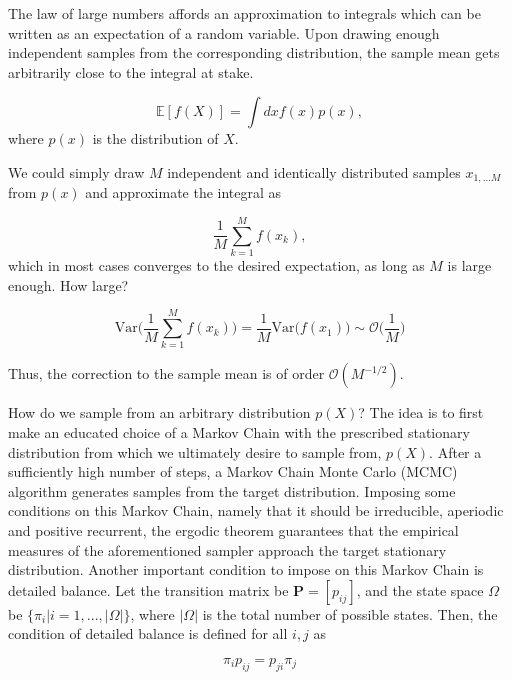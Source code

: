 The law of large numbers affords an approximation to integrals which can be written as an expectation of a random variable. Upon drawing enough independent samples from the corresponding distribution, the sample mean gets arbitrarily close to the integral at stake.

\begin{equation}\label{eq:int_mean}
\mathbb{E} [f(X)] = \int dx f(x) p(x),
\end{equation}
where $p(x)$ is the distribution of $X$. 

We could simply draw $M$ independent and identically distributed samples $x_{1,...M}$ from $p(x)$ and approximate the integral as

\begin{equation}
\frac{1}{M} \sum_{k=1}^M f (x_k) , 
\end{equation}
which in most cases converges to the desired expectation, as long as $M$ is large enough. How large?

\begin{equation}\label{eq:variance}
\text{Var}\bigg( \frac{1}{M} \sum_{k=1}^M f(x_k) \bigg) = \frac{1}{M} \text{Var}\bigg( f(x_1) \bigg) \sim \mathcal{O}\bigg(\frac{1}{M}\bigg)
\end{equation}

Thus, the correction to the sample mean is of order $\mathcal{O}(M^{-1/2})$.

How do we sample from an arbitrary distribution $p(X)$? The idea is to first make an educated choice of a Markov Chain with the prescribed stationary distribution from which we ultimately desire to sample from, $p(X)$. After a sufficiently high number of steps, a Markov Chain Monte Carlo (MCMC) algorithm generates samples from the target distribution. Imposing some conditions on this Markov Chain, namely that it should be irreducible, aperiodic and positive recurrent, the ergodic theorem guarantees that the empirical measures of the aforementioned sampler approach the target stationary distribution. Another important condition to impose on this Markov Chain is detailed balance. Let the transition matrix be $\bm P = [p_{ij}]$, and the state space $\Omega$ be $\{\pi_i | i=1, ..., |\Omega| \}$, where $|\Omega|$ is the total number of possible states. Then, the condition of detailed balance is defined for all $i, j$ as

\begin{equation}
\pi_i p_{ij} = p_{ji} \pi_j 
\end{equation}

